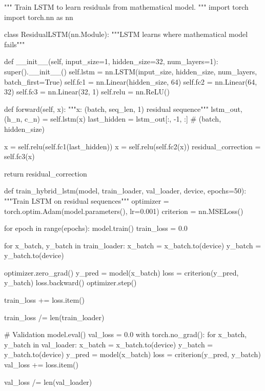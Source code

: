 """
Train LSTM to learn residuals from mathematical model.
"""
import torch
import torch.nn as nn

class ResidualLSTM(nn.Module):
    """LSTM learns where mathematical model fails"""
    
    def \_\_init\_\_(self, input\_size=1, hidden\_size=32, num\_layers=1):
        super().\_\_init\_\_()
        self.lstm = nn.LSTM(input\_size, hidden\_size, num\_layers, batch\_first=True)
        self.fc1 = nn.Linear(hidden\_size, 64)
        self.fc2 = nn.Linear(64, 32)
        self.fc3 = nn.Linear(32, 1)
        self.relu = nn.ReLU()
    
    def forward(self, x):
        """x: (batch, seq\_len, 1) residual sequence"""
        lstm\_out, (h\_n, c\_n) = self.lstm(x)
        last\_hidden = lstm\_out[:, -1, :]  \# (batch, hidden\_size)
        
        x = self.relu(self.fc1(last\_hidden))
        x = self.relu(self.fc2(x))
        residual\_correction = self.fc3(x)
        
        return residual\_correction

def train\_hybrid\_lstm(model, train\_loader, val\_loader, device, epochs=50):
    """Train LSTM on residual sequences"""
    optimizer = torch.optim.Adam(model.parameters(), lr=0.001)
    criterion = nn.MSELoss()
    
    for epoch in range(epochs):
        model.train()
        train\_loss = 0.0
        
        for x\_batch, y\_batch in train\_loader:
            x\_batch = x\_batch.to(device)
            y\_batch = y\_batch.to(device)
            
            optimizer.zero\_grad()
            y\_pred = model(x\_batch)
            loss = criterion(y\_pred, y\_batch)
            loss.backward()
            optimizer.step()
            
            train\_loss += loss.item()
        
        train\_loss /= len(train\_loader)
        
        \# Validation
        model.eval()
        val\_loss = 0.0
        with torch.no\_grad():
            for x\_batch, y\_batch in val\_loader:
                x\_batch = x\_batch.to(device)
                y\_batch = y\_batch.to(device)
                y\_pred = model(x\_batch)
                loss = criterion(y\_pred, y\_batch)
                val\_loss += loss.item()
        
        val\_loss /= len(val\_loader)
        
